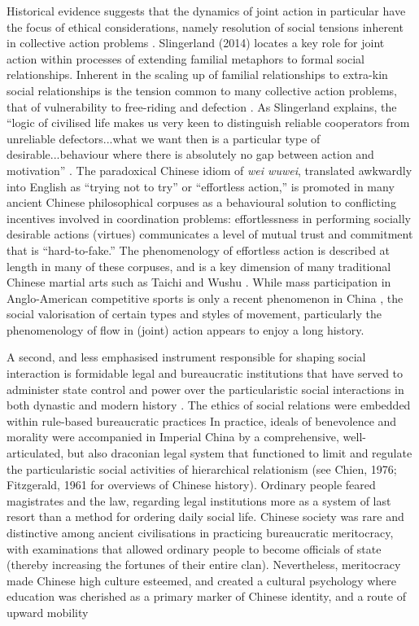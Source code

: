 \begin{CJK}{UTF8}{gbsn}
Historical evidence suggests that the dynamics of joint action in particular have the focus of ethical considerations, namely resolution of social tensions inherent in collective action problems \citep{Slingerland2014}. Slingerland (2014) locates a key role for joint action within processes of extending familial metaphors to formal social relationships.  Inherent in the scaling up of familial relationships to extra-kin social relationships is the tension common to many collective action problems, that of vulnerability to free-riding and defection \citep{Cosmides2013}.
As Slingerland explains, the ``logic of civilised life makes us very keen to distinguish reliable cooperators from unreliable defectors...what we want then is a particular type of desirable...behaviour where there is absolutely no gap between action and motivation'' \citep[192]{Slingerland2014}. The paradoxical Chinese idiom of \textit{wei wuwei}, translated awkwardly into English as ``trying not to try'' or ``effortless action,'' is promoted in many ancient Chinese philosophical corpuses as a behavioural solution to conflicting incentives involved in coordination problems: effortlessness in performing socially desirable actions (virtues) communicates a level of mutual trust and commitment that is ``hard-to-fake.''  The phenomenology of effortless action is described at length in many of these corpuses, and is a key dimension of many traditional Chinese martial arts such as Taichi and Wushu \citep{Morris1998}. While mass participation in Anglo-American competitive sports is only a recent phenomenon in China \citep{Brownell2008}, the social valorisation of certain types and styles of movement, particularly the phenomenology of flow in (joint) action appears to enjoy a long history.


A second, and less emphasised instrument responsible for shaping social interaction is  formidable legal and bureaucratic institutions that have served to administer state control and power over the particularistic social interactions in both dynastic and modern history \citep[]{Liu2017}. The ethics of social relations were embedded within rule-based bureaucratic practices In practice, ideals of benevolence and morality were accompanied in Imperial China by a comprehensive, well-articulated, but also draconian legal system that functioned to limit and regulate the particularistic social activities of hierarchical relationism (see Chien, 1976; Fitzgerald, 1961 for overviews of Chinese history).  Ordinary people feared magistrates and the law, regarding legal institutions more as a system of last resort than a method for ordering daily social life.  Chinese society was rare and distinctive among ancient civilisations in practicing bureaucratic meritocracy, with examinations that allowed ordinary people to become officials of state (thereby increasing the fortunes of their entire clan).  Nevertheless, meritocracy made Chinese high culture esteemed, and created a cultural psychology where education was cherished as a primary marker of Chinese identity, and a route of upward mobility


\end{CJK}
